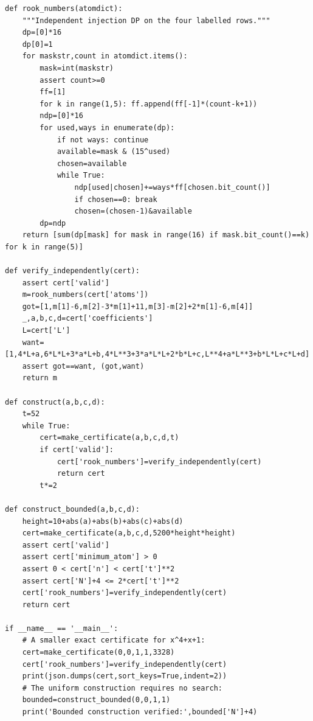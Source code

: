 \documentclass[11pt,a4paper]{article}
\theoremstyle{definition}
\begin{document}
\begin{lstlisting}
def rook_numbers(atomdict):
    """Independent injection DP on the four labelled rows."""
    dp=[0]*16
    dp[0]=1
    for maskstr,count in atomdict.items():
        mask=int(maskstr)
        assert count>=0
        ff=[1]
        for k in range(1,5): ff.append(ff[-1]*(count-k+1))
        ndp=[0]*16
        for used,ways in enumerate(dp):
            if not ways: continue
            available=mask & (15^used)
            chosen=available
            while True:
                ndp[used|chosen]+=ways*ff[chosen.bit_count()]
                if chosen==0: break
                chosen=(chosen-1)&available
        dp=ndp
    return [sum(dp[mask] for mask in range(16) if mask.bit_count()==k) for k in range(5)]

def verify_independently(cert):
    assert cert['valid']
    m=rook_numbers(cert['atoms'])
    got=[1,m[1]-6,m[2]-3*m[1]+11,m[3]-m[2]+2*m[1]-6,m[4]]
    _,a,b,c,d=cert['coefficients']
    L=cert['L']
    want=[1,4*L+a,6*L*L+3*a*L+b,4*L**3+3*a*L*L+2*b*L+c,L**4+a*L**3+b*L*L+c*L+d]
    assert got==want, (got,want)
    return m

def construct(a,b,c,d):
    t=52
    while True:
        cert=make_certificate(a,b,c,d,t)
        if cert['valid']:
            cert['rook_numbers']=verify_independently(cert)
            return cert
        t*=2

def construct_bounded(a,b,c,d):
    height=10+abs(a)+abs(b)+abs(c)+abs(d)
    cert=make_certificate(a,b,c,d,5200*height*height)
    assert cert['valid']
    assert cert['minimum_atom'] > 0
    assert 0 < cert['n'] < cert['t']**2
    assert cert['N']+4 <= 2*cert['t']**2
    cert['rook_numbers']=verify_independently(cert)
    return cert

if __name__ == '__main__':
    # A smaller exact certificate for x^4+x+1:
    cert=make_certificate(0,0,1,1,3328)
    cert['rook_numbers']=verify_independently(cert)
    print(json.dumps(cert,sort_keys=True,indent=2))
    # The uniform construction requires no search:
    bounded=construct_bounded(0,0,1,1)
    print('Bounded construction verified:',bounded['N']+4)
\end{lstlisting}
\end{document}
